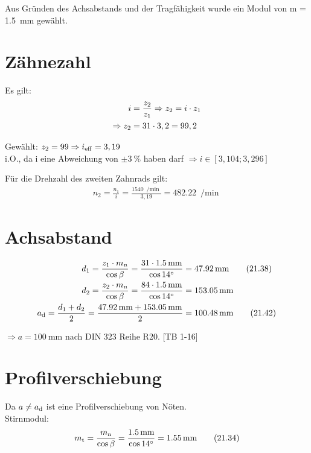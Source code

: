 \documentclass[15pt,a4paper]{article}
\begin{document}
	
	Aus Gründen des Achsabstands und der Tragfähigkeit wurde ein Modul von m = \SI{1,5}{\milli\metre} gewählt.
	\section{Zähnezahl}
	
	Es gilt: 
	\begin{align}
		i &= \frac{z_2}{z_1} \Rightarrow z_2 = i \cdot z_1 \notag\\
		\Rightarrow z_2 &= 31\cdot 3,2 = 99,2\notag
	\end{align}
	
	Gewählt: $z_2 = 99 \Rightarrow i_{\rm eff} = 3,19$\\
	i.O., da i eine Abweichung von $\pm \SI{3}{\percent}$ haben darf $\Rightarrow i\in \left[3,104; 3,296 \right] $
	
	Für die Drehzahl des zweiten Zahnrads gilt:
	\begin{align}
		n_2 = \frac{n_1}{i}=\frac{\SI{1540}{\per\min}}{3,19} = \SI{482,22}{\per\min} \tag{21.9}
	\end{align}
	
	
	\section{Achsabstand}
	\begin{align}
		d_1 = \frac{z_1\cdot m_n}{\cos \beta} = \frac{31\cdot \SI{1,5}{\milli\metre}}{\cos 14^\circ} &= \SI{47,92}{\milli\metre} \tag{21.38} \\
		d_2 = \frac{z_2\cdot m_n}{\cos \beta} = \frac{84\cdot \SI{1,5}{\milli\metre}}{\cos 14^\circ} &=\SI{153,05}{\milli\metre} \notag \\
		a_{\rm d} = \frac{d_1+d_2}{2}=\frac{\SI{47,92}{\milli\metre} + \SI{153,05}{\milli\metre}}{2} &= \SI{100,48}{\milli\metre} 	\tag{21.42}
	\end{align}
	 
	 $\Rightarrow a = \SI{100}{\milli\m}$ nach DIN 323 Reihe R20. [TB 1-16]
	 \section{Profilverschiebung}
	 Da $a\neq a_{\rm d}$ ist eine Profilverschiebung von Nöten.\\
	 Stirnmodul:
	 \begin{align}m_{\rm t} = \frac{m_{\rm n}}{\cos \beta} = \frac{\SI{1,5}{\milli \m}}{\cos 14^\circ} = \SI{1,55}{\milli\m} \tag{21.34} \end{align}
	 
\end{document}
